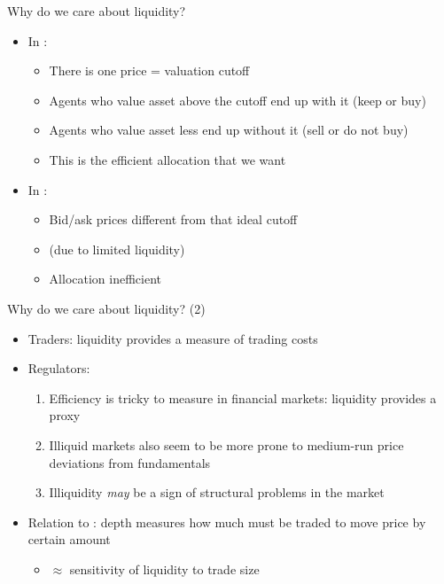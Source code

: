 \documentclass[english,10pt]{beamer}
\begin{document}
\begin{frame}{Why do we care about liquidity?}
	\begin{itemize}
		\item In :
		\begin{itemize}
			\item There is one price = valuation cutoff
			\item Agents who value asset above the cutoff end up with it (keep or buy)
			\item Agents who value asset less end up without it (sell or do not buy)
			\item This is the \alert{efficient} allocation that we want
		\end{itemize}
	\pause
		\item In :
		\begin{itemize}
			\item Bid/ask prices different from that ideal cutoff
			\item (due to limited liquidity)
			\item Allocation \alert{inefficient}
		\end{itemize}
	\end{itemize}
\end{frame}


\begin{frame}{Why do we care about liquidity? (2)}
\begin{itemize}
	\item Traders: liquidity provides a measure of trading costs
	\item Regulators:
	\begin{enumerate}
		\item Efficiency is tricky to measure in financial markets: liquidity provides a proxy
		\item Illiquid markets also seem to be more prone to medium-run price deviations from fundamentals
		\item Illiquidity \textit{may} be a sign of structural problems in the market
	\end{enumerate}
	\item Relation to : depth measures how much must be traded to move price by certain amount
	\begin{itemize}
		\item $\approx$ sensitivity of liquidity to trade size
	\end{itemize}
\end{itemize}
\end{frame}
\end{document}
